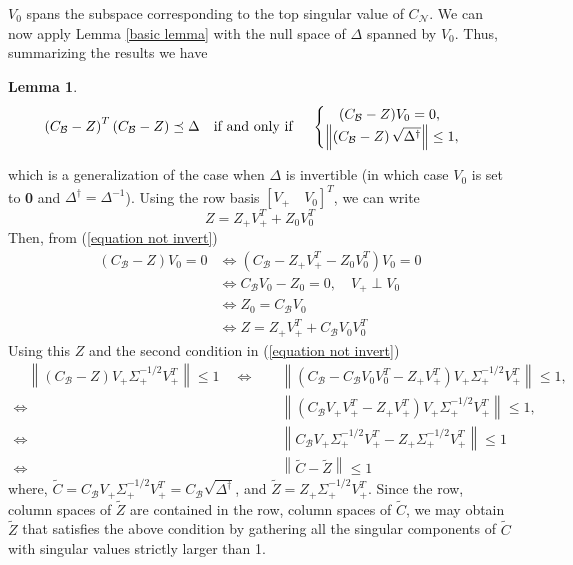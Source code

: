 \documentclass[11pt]{article}
\newtheorem{lemma}[theorem]{Lemma}
\renewcommand{\math}[1]{$#1$}
\newcommand{\norm}[1]{\left\|#1\right\|}
\newcommand{\Leq}{\preceq}
\newcommand{\B}{\mathcal{B}}
\newcommand{\N}{\mathcal{N}}
\newcommand{\0}{\ensuremath{\mathbf{0}}}
\renewcommand{\>}{\succ}
\newcommand{\<}{\prec}
\renewcommand{\iff}{\ensuremath{\Leftrightarrow}}
\begin{document}
\math{V_0} spans the subspace corresponding to the top singular
value of \math{C_{\N}}.
We can now apply Lemma \ref{basic lemma} with the null space of 
$\Delta$ spanned by $V_0$. Thus, summarizing the results we have
\begin{lemma}\label{combined}
\begin{eqnarray}\label{equation not invert}
\left( {C}_{\B} - {Z} \right)^T \left( {C}_{\B} - {Z} \right) \Leq \Delta 
\text{\quad if and only if \quad }
\begin{cases}
\quad (C_{\B} - Z)V_0 = 0, \\
\norm{\left( {C}_{\B} - {Z} \right) \sqrt{\Delta^{\dagger}} } \leq 1,
\end{cases}
\end{eqnarray}
\end{lemma}
\noindent which is a generalization of the case when \math{\Delta} is invertible (in which case \math{V_0} is set to \textbf{0} and \math{\Delta^\dagger=\Delta^{-1}}).
Using the row basis  $[V_+ \quad V_0]^T$, we can write
\[Z = Z_+V_+^T + Z_0V_0^T\]
Then, from (\ref{equation not invert})
\begin{align*}
(C_{\B} - Z)V_0 = 0 & \iff (C_{\B} - Z_+V_+^T - Z_0V_0^T)V_0 = 0\\
& \iff C_{\B}V_0 - Z_0 = 0, \quad V_+ \perp V_0\\
& \iff Z_0 = C_{\B}V_0\\
& \iff Z = Z_+V_+^T + C_{\B}V_0V_0^T
\end{align*}
Using this $Z$ and the second condition in (\ref{equation not invert})
\begin{align*}
\quad \norm{\left( {C}_{\B} - {Z} \right) V_+ {\Sigma}^{-1/2}_+V_+^T } \leq 1 \quad \iff & \quad \norm{\left( {C}_{\B} - C_{\B}V_0V_0^T - Z_+V_+^T \right) V_+ {\Sigma}^{-1/2}_+V_+^T } \leq 1,\\
\iff & \quad \norm{\left(C_{\B}V_+V_+^T - Z_+V_+^T \right) V_+ {\Sigma}^{-1/2}_+V_+^T } \leq 1,\\
\iff & \quad \norm{C_{\B}V_+{\Sigma}^{-1/2}_+V_+^T  - Z_+{\Sigma}^{-1/2}_+V_+^T } \leq 1\\
\iff & \quad \norm{\tilde{C} - \tilde{Z}} \leq 1
\end{align*}
where, \quad $\tilde{C} = C_{\B}V_+{\Sigma}^{-1/2}_+V_+^T = C_{\B} \sqrt{\Delta^{\dagger}}$, \quad and \quad $\tilde{Z} = Z_+{\Sigma}^{-1/2}_+V_+^T$.
Since the row, column spaces of $\tilde Z$ are contained in the row, column spaces of $\tilde C$, we may obtain $\tilde{Z}$ that satisfies the above condition by gathering all the singular components of $\tilde{C}$ with singular values strictly larger than 1. 
\end{document}
